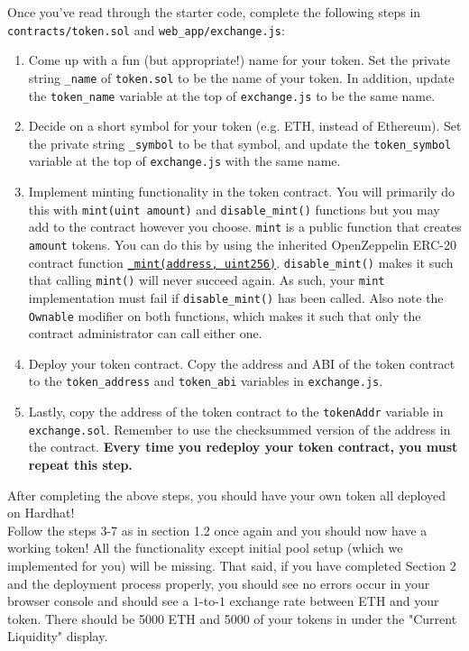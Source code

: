 \documentclass[11pt]{article}
\begin{document}
Once you've read through the starter code, complete the following steps in \verb|contracts/token.sol| and \verb|web_app/exchange.js|:
\begin{enumerate}
    \item Come up with a fun (but appropriate!) name for your token. Set the private string \verb|_name| of \verb|token.sol| to be the name of your token. In addition, update the \verb+token_name+ variable at the top of \texttt{exchange.js} to be the same name.
    
    \item Decide on a short symbol for your token (e.g. ETH, instead of Ethereum). Set the private string \verb|_symbol| to be that symbol, and update the \texttt{token\_symbol} variable at the top of \texttt{exchange.js} with the same name.
    \item Implement minting functionality in the token contract. You will primarily do this with \texttt{mint(uint amount)} and \texttt{disable\_mint()} functions but you may add to the contract however you choose. \texttt{mint} is a public function that creates \texttt{amount} tokens. You can do this by using the inherited OpenZeppelin ERC-20 contract function \href{https://docs.openzeppelin.com/contracts/2.x/api/token/erc20#ERC20-_mint-address-uint256-}{\texttt{\_mint(address, uint256)}}. \texttt{disable\_mint()} makes it such that calling \texttt{mint()} will never succeed again. As such, your \texttt{mint} implementation must fail if \texttt{disable\_mint()} has been called. Also note the \texttt{Ownable} modifier on both functions, which makes it such that only the contract administrator can call either one.
    
    \item Deploy your token contract. Copy the address and ABI of the token contract to the \texttt{token\_address} and \texttt{token\_abi} variables in \texttt{exchange.js}.
    
    \item Lastly, copy the address of the token contract to the \texttt{tokenAddr} variable in \texttt{exchange.sol}. Remember to use the checksummed version of the address in the contract. \textbf{Every time you redeploy your token contract, you must repeat this step.}
\end{enumerate}

After completing the above steps, you should have your own token all deployed on Hardhat! \\

Follow the steps 3-7 as in section 1.2 once again and you should now have a working token! All the functionality except initial pool setup (which we implemented for you) will be missing. That said, if you have completed Section 2 and the deployment process properly, you should see no errors occur in your browser console and should see a $1$-to-$1$ exchange rate between ETH and your token. There should be 5000 ETH and 5000 of your tokens in under the "Current Liquidity" display.
\end{document}
